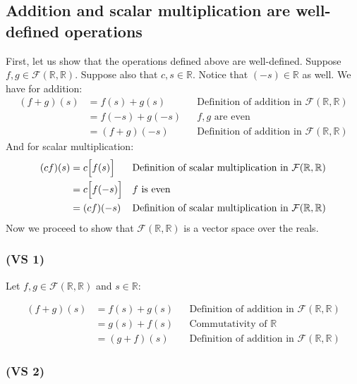 \documentclass{article}
\begin{document}
\subsection*{Addition and scalar multiplication are well-defined operations}

First, let us show that the operations defined above are well-defined. Suppose \(f, g \in \mathcal{F}(\mathbb{R}, \mathbb{R})\).
Suppose also that \(c, s \in \mathbb{R}\). Notice that \((-s) \in \mathbb{R}\) as well.
We have for addition:
\begin{align*}
    (f + g)(s) &= f(s) + g(s) && \text{Definition of addition in \(\mathcal{F}(\mathbb{R}, \mathbb{R})\)} \\
               &= f(-s) + g(-s) && \text{\(f, g\) are even} \\
               &= (f + g)(-s) && \text{Definition of addition in \(\mathcal{F}(\mathbb{R}, \mathbb{R})\)}
\end{align*}
And for scalar multiplication:
\begin{align*}
    (cf)(s) &= c\Big[f(s)\Big] && \text{\text{Definition of scalar multiplication in \(\mathcal{F}(\mathbb{R}, \mathbb{R})\)}} \\
            &= c\Big[f(-s)\Big] && \text{\(f\) is even} \\
            &= (cf)(-s) && \text{\text{Definition of scalar multiplication in \(\mathcal{F}(\mathbb{R}, \mathbb{R})\)}}
\end{align*}
Now we proceed to show that \(\mathcal{F}(\mathbb{R}, \mathbb{R})\) is a vector space over the reals.

\subsubsection*{(VS 1)}
Let \(f, g \in \mathcal{F}(\mathbb{R}, \mathbb{R})\) and \( s \in \mathbb{R}\):

\begin{align*}
    (f + g)(s)  &=  f(s) + g(s)             &&     \text{Definition of addition in \(\mathcal{F}(\mathbb{R}, \mathbb{R})\)} \\[6pt] 
                &=  g(s) + f(s)             &&     \text{Commutativity of \(\mathbb{R}\)} \\[6pt] 
                &=  (g + f)(s)              &&     \text{Definition of addition in \(\mathcal{F}(\mathbb{R}, \mathbb{R})\)}
\end{align*}

\subsubsection*{(VS 2)}
\end{document}
